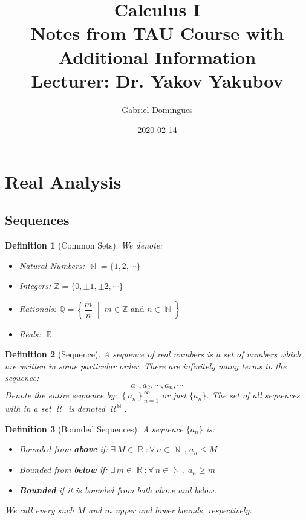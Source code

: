 \documentclass[12pt]{article}
\title{%
  Calculus I \\
  \large Notes from TAU Course with Additional Information \\
  Lecturer: Dr. Yakov Yakubov
}
\author{Gabriel Domingues}
\date{2020-02-14}
\newcommand{\set}[2]{\left\{{#1}\;\middle|\;{#2}\right\}}
\newcommand{\Forall}[1]{\forall\,{#1}\,,\,}
\newcommand{\Exist}[1]{\exists\,{#1}:}
\newcommand{\seq}[2]{\left\{{#1}\right\}_{#2 =1}^\infty}
\DeclareMathOperator{\N}{\mathbb{N}}
\DeclareMathOperator{\R}{\mathbb{R}}
\DeclareMathOperator{\U}{\mathcal{U}}
\newtheorem{definition}{Definition}[subsection]
\begin{document}
\maketitle

\setlength{\parindent}{0ex}
\setlength{\parskip}{1em}

\tableofcontents

\doclicenseThis

\pagebreak

\section{Real Analysis}

\subsection{Sequences}

\begin{definition}[Common Sets]
  We denote:
  \begin{itemize}
    \item[] Natural Numbers: $\N=\{1,2,\cdots\}$ 
    \item[] Integers: $\mathbb{Z} = \{0,\pm 1,\pm 2,\cdots\}$
    \item[] Rationals: $\mathbb{Q}=\set{\dfrac{m}{n}}{m\in\mathbb{Z}\text{ and } n\in\N}$
    \item[] Reals: $\R$
  \end{itemize}
\end{definition}

\begin{definition}[Sequence]
  A sequence of real numbers is a set of numbers which are written in some particular order. There are infinitely many terms to the sequence:
  $$a_1,a_2,\cdots,a_n,\cdots$$
  Denote the entire sequence by: $\seq{a_n}{n}$ or just $\{a_n\}$. The set of all sequences with in a set $\U$ is denoted $\U^{\N}$.
\end{definition}

\begin{definition}[Bounded Sequences]
  A sequence $\{a_n\}$ is:
  \begin{itemize}
    \item[] Bounded from \textbf{above} if: $\Exist{M\in\R}\Forall{n\in\N}a_n\leq M$
    \item[] Bounded from \textbf{below} if: $\Exist{m\in\R}\Forall{n\in\N}a_n\geq m$
    \item[] \textbf{Bounded} if it is bounded from both above and below.
  \end{itemize}
  We call every such $M$ and $m$ upper and lower bounds, respectively. 
\end{definition}
\end{document}
